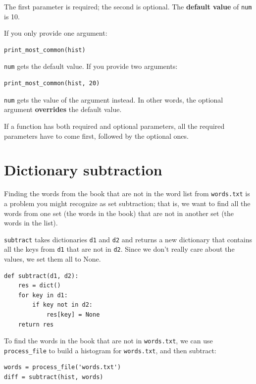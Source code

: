\documentclass[10pt]{book}
\begin{document}
{The first parameter is required; the second is optional.
The {\bf default value} of {\tt num} is 10.


If you only provide one argument:

\beforeverb
\begin{verbatim}
print_most_common(hist)
\end{verbatim}
\afterverb

{\tt num} gets the default value.  If you provide two arguments:

\beforeverb
\begin{verbatim}
print_most_common(hist, 20)
\end{verbatim}
\afterverb

{\tt num} gets the value of the argument instead.  In other
words, the optional argument {\bf overrides} the default value.


If a function has both required and optional parameters, all
the required parameters have to come first, followed by the
optional ones.


\section{Dictionary subtraction}


Finding the words from the book that are not in the word list
from {\tt words.txt} is a problem you might recognize as set
subtraction; that is, we want to find all the words from one
set (the words in the book) that are not in another set (the
words in the list).

{\tt subtract} takes dictionaries {\tt d1} and {\tt d2} and returns a
new dictionary that contains all the keys from {\tt d1} that are not
in {\tt d2}.  Since we don't really care about the values, we
set them all to None.

\beforeverb
\begin{verbatim}
def subtract(d1, d2):
    res = dict()
    for key in d1:
        if key not in d2:
            res[key] = None
    return res
\end{verbatim}
\afterverb
%
To find the words in the book that are not in {\tt words.txt},
we can use \verb"process_file" to build a histogram for
{\tt words.txt}, and then subtract:

\beforeverb
\begin{verbatim}
words = process_file('words.txt')
diff = subtract(hist, words)


\end{verbatim}}
\end{document}
